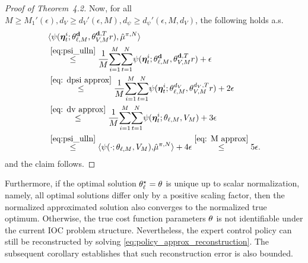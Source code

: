 \begin{proof}[Proof of Theorem~4.2]
Now, for all $ M\geq M_1'(\epsilon), d_V\geq d_V'(\epsilon, M), d_\psi\geq d_\psi'(\epsilon,M,d_V)$, the following holds a.s. 
\begin{align*}
    &\langle \psi(\bm\eta_t^i;\theta_{\ell,M}^{\mathbf{d}},\theta_{V,M}^{\mathbf{d},T}r), \hat{\mu}^{\pitrue,N} \rangle \\
    &\overset{\eqref{eq:psi_ulln}}{\le} \frac{1}{M}\!\sum_{i=1}^M\!\sum_{t=1}^N\!\psi(\bm\eta_t^i;\theta_{\ell,M}^{\mathbf{d}},\theta_{V,M}^{\mathbf{d},T}r) + \epsilon \\
    &\overset{\eqref{eq: dpsi approx}}{\le} \frac{1}{M}\!\sum_{i=1}^M\!\sum_{t=1}^N\!\psi(\bm\eta_t^i;\theta_{\ell,M}^{d_V},\theta_{V,M}^{d_V,T}r) +2\epsilon \\
    &\overset{\eqref{eq: dv approx}}{\le} \frac{1}{M}\!\sum_{i=1}^M\!\sum_{t=1}^N\!\psi(\bm\eta_t^i;\theta_{\ell,M},V_M) + 3\epsilon\\
    &\overset{\eqref{eq:psi_ulln}}{\le} \langle \psi(\cdot;\theta_{\ell,M}, V_M),\!\hat\mu^{\pitrue,N} \rangle + 4\epsilon\overset{\eqref{eq: M approx}}{\le} 5\epsilon.
\end{align*}
and the claim follows.
\end{proof}
Furthermore, if the optimal solution $\theta_\ell^\star = \relax{\theta}$ is unique up to scalar normalization, namely, all optimal solutions differ only by a positive scaling factor, then the normalized approximated solution also converges to the normalized true optimum.
Otherwise, the true cost function parameters $\relax{\theta}$ is not identifiable under the current IOC problem structure. 
Nevertheless, the expert control policy can still be reconstructed by solving \eqref{eq:policy_approx_reconstruction}. The subsequent corollary establishes that such reconstruction error is also bounded.

